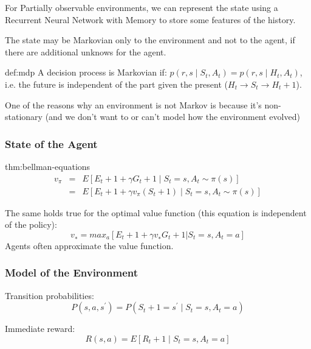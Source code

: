 For Partially observable environments, we can represent the state using a Recurrent Neural Network with Memory to store some features of the history.

The state may be Markovian only to the environment and not to the agent, if there are additional unknows for the agent.

\begin{definition}{def:mdp}
    A decision process is Markovian if: $p(r, s ∣ S_t, A_t) = p(r, s ∣ H_t, A_t)$, i.e. the future is independent of the part given the present ($H_t \rightarrow S_t \rightarrow H_t+1$).
\end{definition}

One of the reasons why an environment is not Markov is because it's non-stationary (and we don't want to or can't model how the environment evolved)

\subsubsection{State of the Agent}

\begin{theorem}{thm:bellman-equations}
    \begin{eqnarray}
        v_\pi &=& E[E_t + 1 + \gamma G_t + 1 ∣ S_t = s, A_t \sim \pi(s)] \\
        &=& E[E_t + 1 + \gamma v_\pi(S_t+1) ∣ S_t=s, A_t \sim \pi(s)]
    \end{eqnarray}
\end{theorem}

The same holds true for the optimal value function (this equation is independent of the policy):
\begin{equation}
    v_∗ = max_a[E_t + 1 + \gamma v_∗ G_t + 1 | S_t = s, A_t = a]
\end{equation}
Agents often approximate the value function.

\subsubsection{Model of the Environment}

Transition probabilities:
\begin{equation}
    P(s, a, s^\prime) = P(S_t + 1 = s^\prime ∣ S_t = s, A_t = a)
\end{equation}

Immediate reward:
\begin{equation}
    R(s, a) = E[R_t + 1 ∣ S_t = s, A_t = a]
\end{equation}



